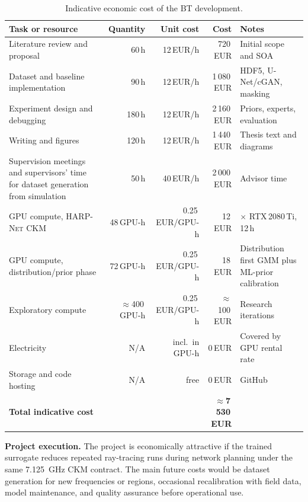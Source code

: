 \begin{table}[htbp]
\centering
\footnotesize
\renewcommand{\arraystretch}{1.1}
\caption{Indicative economic cost of the BT development.}
\label{tab:sustainability_budget}
\begin{tabularx}{\textwidth}{>{\raggedright\arraybackslash}Xrrr>{\raggedright\arraybackslash}p{3cm}}
\toprule
Task or resource & Quantity & Unit cost & Cost & Notes \\
\midrule
Literature review and proposal     & 60\,h         & 12\,EUR/h        &    720\,EUR & Initial scope and SOA \\
Dataset and baseline implementation & 90\,h        & 12\,EUR/h        & 1\,080\,EUR & HDF5, U-Net/cGAN, masking \\
Experiment design and debugging    & 180\,h        & 12\,EUR/h        & 2\,160\,EUR & Priors, experts, evaluation \\
Writing and figures                & 120\,h        & 12\,EUR/h        & 1\,440\,EUR & Thesis text and diagrams \\
Supervision meetings and supervisors' time for dataset generation from simulation & 50\,h         & 40\,EUR/h        & 2\,000\,EUR & Advisor time \\
GPU compute, \textsc{HARP-Net CKM}    & 48\,GPU-h     & 0.25\,EUR/GPU-h  &    12\,EUR  & 4$\times$ RTX\,2080\,Ti, 12\,h \\
GPU compute, distribution/prior phase & 72\,GPU-h  & 0.25\,EUR/GPU-h  &    18\,EUR  & Distribution first GMM plus ML-prior calibration \\
Exploratory compute                & $\approx$400\,GPU-h & 0.25\,EUR/GPU-h & $\approx$100\,EUR & Research iterations \\
Electricity                        & N/A           & incl.\ in GPU-h  &     0\,EUR  & Covered by GPU rental rate \\
Storage and code hosting           & N/A           & free             &     0\,EUR  & GitHub \\
\midrule
\textbf{Total indicative cost}     &               &                  & \textbf{$\approx$7\,530\,EUR} & \\
\bottomrule
\end{tabularx}
\end{table}

\textbf{Project execution.} The project is economically attractive if the
trained surrogate reduces repeated ray-tracing runs during network planning
under the same \SI{7.125}{GHz} CKM contract.
The main future costs would be dataset generation for new frequencies or
regions, occasional recalibration with field data, model maintenance, and
quality assurance before operational use.

